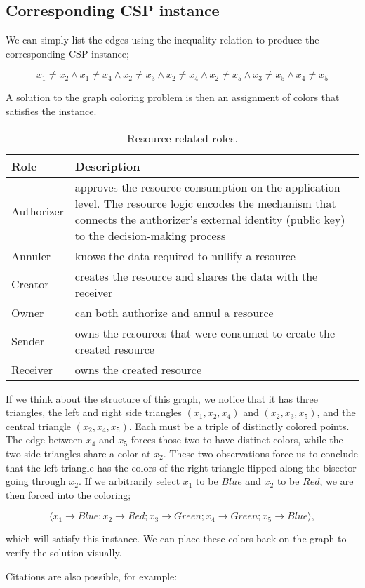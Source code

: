 \subsection{Corresponding CSP instance}

We can simply list the edges using the inequality relation to produce the corresponding CSP instance;

\begin{equation}
    x_1 \neq x_2 \wedge x_1 \neq x_4 \wedge x_2 \neq x_3 \wedge x_2 \neq x_4 \wedge x_2 \neq x_5 \wedge x_3 \neq x_5 \wedge x_4 \neq x_5
\end{equation}

A solution to the graph coloring problem is then an assignment of colors that satisfies the instance. 


\begin{table*}[!h]
\begin{center}
\begin{tabular}{|p{1.5cm}|p{13cm}|}
\hline
 \textbf{Role} & \textbf{Description} \\ \hline
 Authorizer & approves the resource consumption on the application level. The resource logic encodes the mechanism that connects the authorizer's external identity (public key) to the decision-making process \\ \hline
 Annuler & knows the data required to nullify a resource
 \\ \hline
Creator & creates the resource and shares the data with the receiver
\\ \hline
Owner & can both authorize and annul a resource
\\ \hline
Sender & owns the resources that were consumed to create the created resource
\\ \hline
Receiver & owns the created resource
\\ \hline
\end{tabular}
\caption{Resource-related roles.}
\end{center}
\end{table*}


If we think about the structure of this graph, we notice that it has three triangles, the left and right side triangles $(x_1, x_2, x_4)$  and $(x_2, x_3, x_5)$, and the central triangle $(x_2, x_4, x_5)$. Each must be a triple of distinctly colored points. The edge between $x_4$ and $x_5$ forces those two to have distinct colors, while the two side triangles share a color at $x_2$. These two observations force us to conclude that the left triangle has the colors of the right triangle flipped along the bisector going through $x_2$. If we arbitrarily select $x_1$ to be $\mathit{Blue}$ and $x_2$ to be $\mathit{Red}$, we are then forced into the coloring;

\begin{equation}
 \langle x_1 \rightarrow \mathit{Blue}; x_2 \rightarrow \mathit{Red}; x_3 \rightarrow \mathit{Green}; x_4 \rightarrow \mathit{Green}; x_5 \rightarrow \mathit{Blue}\rangle,
\end{equation}

which will satisfy this instance. We can place these colors back on the graph to verify the solution visually.

Citations are also possible, for example: \citep{christopher_goes_2023_8279842}